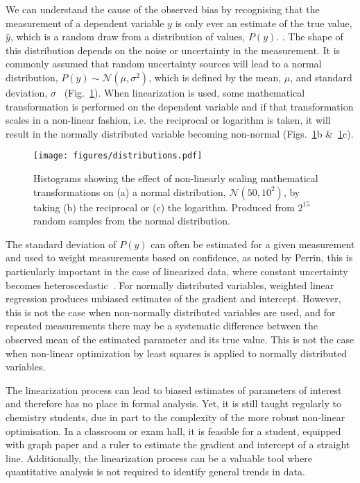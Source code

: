 \documentclass[journal=jacsat,manuscript=article]{achemso}
\begin{document}
We can understand the cause of the observed bias by recognising that the measurement of a dependent variable $y$ is only ever an estimate of the true value, $\hat{y}$, which is a random draw from a distribution of values, $P(y)$. 
.
The shape of this distribution depends on the noise or uncertainty in the measurement. 
It is commonly assumed that random uncertainty sources will lead to a normal distribution, $P(y) \sim \mathcal{N}(\mu, \sigma^2)$, which is defined by the mean, $\mu$, and standard deviation, $\sigma$~\cite{monk_math_2010} (Fig.~\ref{fig:distributions}).
When linearization is used, some mathematical transformation is performed on the dependent variable and if that transformation scales in a non-linear fashion, i.e. the reciprocal or logarithm is taken, it will result in the normally distributed variable becoming non-normal (Figs.~\ref{fig:distributions}b \&~\ref{fig:distributions}c).
%
\begin{figure}
  \texttt{[image: figures/distributions.pdf]}
  \caption{
    Histograms showing the effect of non-linearly scaling mathematical transformations on (a) a normal distribution, $\mathcal{N}(50, 10^2)$, by taking (b) the reciprocal or (c) the logarithm. 
    Produced from $2^{15}$ random samples from the normal distribution.
    }
  \label{fig:distributions}
\end{figure}
%

The standard deviation of $P(y)$ can often be estimated for a given measurement and used to weight measurements based on confidence, as noted by Perrin, this is particularly important in the case of linearized data, where constant uncertainty becomes heteroscedastic~\cite{perrin_linear_2017}.
For normally distributed variables, weighted linear regression produces unbiased estimates of the gradient and intercept. 
However, this is not the case when non-normally distributed variables are used, and for repeated measurements there may be a systematic difference between the observed mean of the estimated parameter and its true value.
This is not the case when non-linear optimization by least squares is applied to normally distributed variables. 

The linearization process can lead to biased estimates of parameters of interest and therefore has no place in formal analysis. 
Yet, it is still taught regularly to chemistry students, due in part to the complexity of the more robust non-linear optimisation. 
In a classroom or exam hall, it is feasible for a student, equipped with graph paper and a ruler to estimate the gradient and intercept of a straight line. 
Additionally, the linearization process can be a valuable tool where quantitative analysis is not required to identify general trends in data. 
\end{document}
